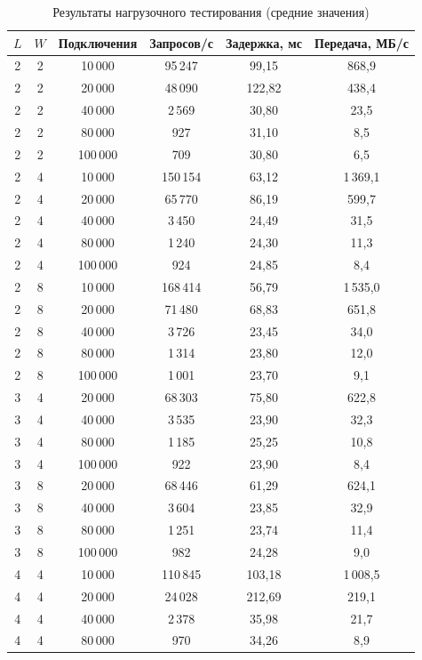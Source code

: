 \begin{table}[H]
\centering
\caption{Результаты нагрузочного тестирования (средние значения)}
\label{tab:benchmark}
\begin{tabular}{|c|c|c|c|c|c|}
\hline
$L$ & $W$ & Подключения & Запросов/с & Задержка, мс & Передача, МБ/с \\
\hline
2 & 2 & 10\,000 & 95\,247 & 99,15 & 868,9 \\
\hline
2 & 2 & 20\,000 & 48\,090 & 122,82 & 438,4 \\
\hline
2 & 2 & 40\,000 & 2\,569 & 30,80 & 23,5 \\
\hline
2 & 2 & 80\,000 & 927 & 31,10 & 8,5 \\
\hline
2 & 2 & 100\,000 & 709 & 30,80 & 6,5 \\
\hline
2 & 4 & 10\,000 & 150\,154 & 63,12 & 1\,369,1 \\
\hline
2 & 4 & 20\,000 & 65\,770 & 86,19 & 599,7 \\
\hline
2 & 4 & 40\,000 & 3\,450 & 24,49 & 31,5 \\
\hline
2 & 4 & 80\,000 & 1\,240 & 24,30 & 11,3 \\
\hline
2 & 4 & 100\,000 & 924 & 24,85 & 8,4 \\
\hline
2 & 8 & 10\,000 & 168\,414 & 56,79 & 1\,535,0 \\
\hline
2 & 8 & 20\,000 & 71\,480 & 68,83 & 651,8 \\
\hline
2 & 8 & 40\,000 & 3\,726 & 23,45 & 34,0 \\
\hline
2 & 8 & 80\,000 & 1\,314 & 23,80 & 12,0 \\
\hline
2 & 8 & 100\,000 & 1\,001 & 23,70 & 9,1 \\
\hline
3 & 4 & 20\,000 & 68\,303 & 75,80 & 622,8 \\
\hline
3 & 4 & 40\,000 & 3\,535 & 23,90 & 32,3 \\
\hline
3 & 4 & 80\,000 & 1\,185 & 25,25 & 10,8 \\
\hline
3 & 4 & 100\,000 & 922 & 23,90 & 8,4 \\
\hline
3 & 8 & 20\,000 & 68\,446 & 61,29 & 624,1 \\
\hline
3 & 8 & 40\,000 & 3\,604 & 23,85 & 32,9 \\
\hline
3 & 8 & 80\,000 & 1\,251 & 23,74 & 11,4 \\
\hline
3 & 8 & 100\,000 & 982 & 24,28 & 9,0 \\
\hline
4 & 4 & 10\,000 & 110\,845 & 103,18 & 1\,008,5 \\
\hline
4 & 4 & 20\,000 & 24\,028 & 212,69 & 219,1 \\
\hline
4 & 4 & 40\,000 & 2\,378 & 35,98 & 21,7 \\
\hline
4 & 4 & 80\,000 & 970 & 34,26 & 8,9 \\
\hline
\end{tabular}
\end{table}

